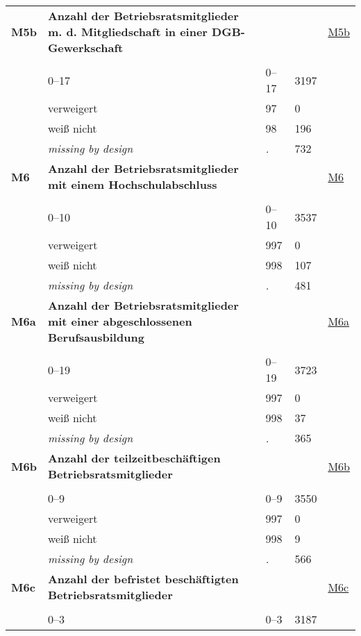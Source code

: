 \begin{longtable}{| L{2.65cm} | L{8cm} | C{1.5cm} | R{1.25cm} | C{2.25cm}  |}
   \midrule
\textbf{M5b}\label{var:M5b} & \textbf{Anzahl der Betriebsratsmitglieder m. d. Mitgliedschaft in einer DGB-Gewerkschaft} &  &  & \hyperref[M5b]{M5b} \\ 
   &  &  &  &  \\ 
   & 0--17 & 0--17 & 3197 &  \\ 
   & verweigert & 97 & 0 &  \\ 
   & weiß nicht & 98 & 196 &  \\ 
   & \textit{missing by design} & \textit{.} & 732 &  \\ 
   \midrule
\textbf{M6}\label{var:M6} & \textbf{Anzahl der Betriebsratsmitglieder mit einem Hochschulabschluss} &  &  & \hyperref[M6]{M6} \\ 
   &  &  &  &  \\ 
   & 0--10 & 0--10 & 3537 &  \\ 
   & verweigert & 997 & 0 &  \\ 
   & weiß nicht & 998 & 107 &  \\ 
   & \textit{missing by design} & \textit{.} & 481 &  \\ 
   \midrule
\textbf{M6a}\label{var:M6a} & \textbf{Anzahl der Betriebsratsmitglieder mit einer abgeschlossenen Berufsausbildung} &  &  & \hyperref[M6a]{M6a} \\ 
   &  &  &  &  \\ 
   & 0--19 & 0--19 & 3723 &  \\ 
   & verweigert & 997 & 0 &  \\ 
   & weiß nicht & 998 & 37 &  \\ 
   & \textit{missing by design} & \textit{.} & 365 &  \\ 
   \midrule
\textbf{M6b}\label{var:M6b} & \textbf{Anzahl der teilzeitbeschäftigen Betriebsratsmitglieder} &  &  & \hyperref[M6b]{M6b} \\ 
   &  &  &  &  \\ 
   & 0--9 & 0--9 & 3550 &  \\ 
   & verweigert & 997 & 0 &  \\ 
   & weiß nicht & 998 & 9 &  \\ 
   & \textit{missing by design} & \textit{.} & 566 &  \\ 
   \midrule
\textbf{M6c}\label{var:M6c} & \textbf{Anzahl der befristet beschäftigten Betriebsratsmitglieder} &  &  & \hyperref[M6c]{M6c} \\ 
   &  &  &  &  \\ 
   & 0--3 & 0--3 & 3187 &  \\ 

\end{longtable}
